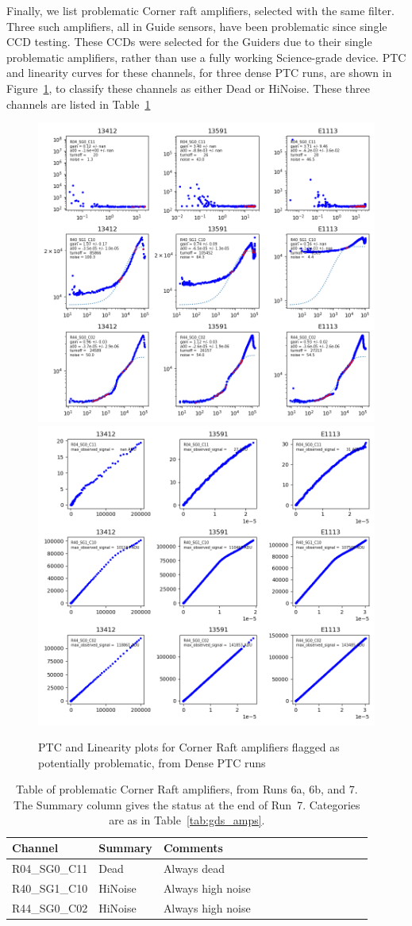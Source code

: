 Finally, we list problematic Corner raft amplifiers, selected with the same filter.  Three such amplifiers, all in Guide sensors, have been problematic since single CCD testing.  These CCDs were selected for the Guiders due to their single problematic amplifiers, rather than use a fully working Science-grade device. PTC and linearity curves for these channels, for three dense PTC runs, are shown in Figure~\ref{fig:ptclin-badamps-corner}, to classify these channels as either Dead or HiNoise. These three channels are listed in Table~\ref{tab:badamps-corner}

\begin{figure}[ht]
    \centering
    \includegraphics[width=0.45\linewidth]{figures/ptc_badamps_corner.png}
    \includegraphics[width=0.45\linewidth]{figures/lin_badamps_corner.png}
    \caption{PTC and Linearity plots for Corner Raft amplifiers flagged as potentially problematic, from Dense PTC runs}
    \label{fig:ptclin-badamps-corner}
\end{figure}

\begin{table}[!ht]
    \tiny
    \centering
    \begin{tabular}{|l|l|l|l|l|l|l|l|l|l|l|l|l|}
    \hline
        Channel & Summary & Comments  \\ \hline

R04\_SG0\_C11  & Dead & Always dead \\ \hline
R40\_SG1\_C10  & HiNoise & Always high noise \\ \hline
R44\_SG0\_C02  & HiNoise & Always high noise\\ \hline

    \end{tabular}
    \caption{Table of problematic Corner Raft amplifiers, from Runs 6a, 6b, and 7. The Summary column gives the status at the end of Run~7. Categories are as in Table~\ref{tab:gds_amps}. \label{tab:badamps-corner}}
\end{table}

